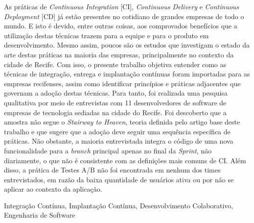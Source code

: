 \resumo

As práticas de \emph{Continuous Integration} [CI], \emph{Continuous Delivery} e \emph{Continuous Deployment} [CD] já estão presentes no cotidiano de grandes empresas de todo o mundo. E isto é devido, entre outras coisas, aos comprovados benefícios que a utilização destas técnicas trazem para a equipe e para o produto em desenvolvimento. Mesmo assim, poucos são os estudos que investigam o estado da arte destas práticas na maioria das empresas, principalmente no contexto da cidade de Recife.  Com isso, o presente trabalho objetiva entender como as técnicas de integração, entrega e implantação contínuas foram importadas para as empresas recifenses, assim como identificar princípios e práticas adjacentes que governam a adoção destas técnicas. Para tanto, foi realizada uma pesquisa qualitativa por meio de entrevistas com 11 desenvolvedores de software de empresas de tecnologia sediadas na cidade do Recife. Foi descoberto que a amostra não segue o \emph{Stairway to Heaven}, teoria definida pelo artigo base deste trabalho e que sugere que a adoção deve seguir uma sequência específica de práticas. Não obstante, a maioria entrevistada integra o código de uma nova funcionalidade para a \emph{branch} principal apenas no final da \emph{Sprint}, não diariamente, o que não é consistente com as definições mais comuns de CI. Além disso, a prática de Testes A/B não foi encontrada em nenhum dos times entrevistados, em razão da baixa quantidade de usuários ativa ou por não se aplicar ao contexto da aplicação.

\begin{keywords}
    Integração Contínua, Implantação Contínua, Desenvolvimento Colaborativo, Engenharia de Software
\end{keywords}
